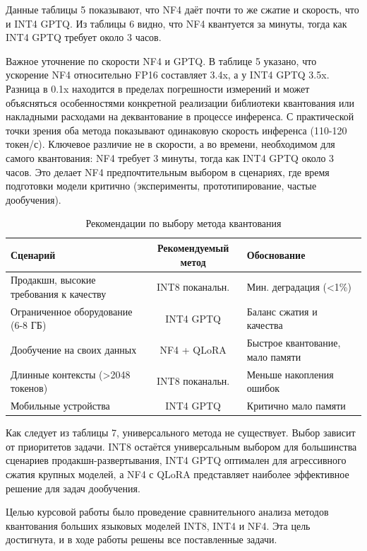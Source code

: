 \documentclass[bachelor, och, coursework]{SCWorks}
\begin{document}
	Данные таблицы 5 показывают, что NF4 даёт почти то же сжатие и скорость, что и INT4 GPTQ. Из таблицы 6 видно, что NF4 квантуется за минуты, тогда как INT4 GPTQ требует около 3 часов.
	
	Важное уточнение по скорости NF4 и GPTQ. В таблице 5 указано, что ускорение NF4 относительно FP16 составляет 3.4x, а у INT4 GPTQ 3.5x. Разница в 0.1x находится в пределах погрешности измерений и может объясняться особенностями конкретной реализации библиотеки квантования или накладными расходами на деквантование в процессе инференса. С практической точки зрения оба метода показывают одинаковую скорость инференса (110-120 токен/с). Ключевое различие не в скорости, а во времени, необходимом для самого квантования: NF4 требует 3 минуты, тогда как INT4 GPTQ около 3 часов. Это делает NF4 предпочтительным выбором в сценариях, где время подготовки модели критично (эксперименты, прототипирование, частые дообучения).
	
	\begin{table}[!ht]
		\centering
		\footnotesize
		\caption{Рекомендации по выбору метода квантования}
		\label{tab:recommendations}
		\begin{tabular}{|p{4.2cm}|c|p{4.2cm}|}
			\hline
			Сценарий & Рекомендуемый метод & Обоснование \\
			\hline
			Продакшн, высокие требования к качеству & INT8 поканальн. & Мин. деградация (<1\%) \\
			\hline
			Ограниченное оборудование (6-8 ГБ) & INT4 GPTQ & Баланс сжатия и качества \\
			\hline
			Дообучение на своих данных & NF4 + QLoRA & Быстрое квантование, мало памяти \\
			\hline
			Длинные контексты (>2048 токенов) & INT8 поканальн. & Меньше накопления ошибок \\
			\hline
			Мобильные устройства & INT4 GPTQ & Критично мало памяти \\
			\hline
		\end{tabular}
	\end{table}
	
	Как следует из таблицы 7, универсального метода не существует. Выбор зависит от приоритетов задачи. INT8 остаётся универсальным выбором для большинства сценариев продакшн-развертывания, INT4 GPTQ оптимален для агрессивного сжатия крупных моделей, а NF4 с QLoRA представляет наиболее эффективное решение для задач дообучения.
	
	\conclusion
	
	Целью курсовой работы было проведение сравнительного анализа методов квантования больших языковых моделей INT8, INT4 и NF4. Эта цель достигнута, и в ходе работы решены все поставленные задачи.
	
\end{document}
